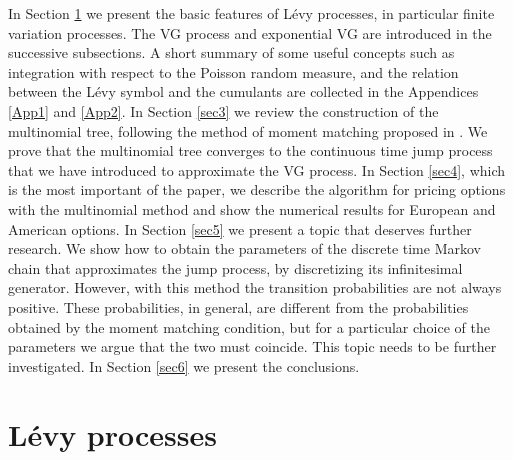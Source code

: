 \documentclass[]{interact}
\theoremstyle{plain}%
\theoremstyle{definition}
\theoremstyle{remark}
\begin{document}
In Section \ref{sec2} we present the basic features of Lévy processes, in particular finite variation processes. 
The VG process and exponential VG are introduced in the successive subsections. 
A short summary of
some useful concepts such as integration with respect to the Poisson random measure, and the relation between the Lévy symbol and the cumulants are collected in 
the Appendices \ref{App1} and \ref{App2}. 
In Section \ref{sec3} we review the construction of the multinomial tree, following the method of
moment matching proposed in \cite{YaPr01}. We prove that the multinomial tree converges to the continuous time jump process that we have
introduced to approximate the VG process.
In Section \ref{sec4}, which is the most important of the paper, we describe the algorithm for pricing options with the 
multinomial method and show the numerical results for European and American options.
In Section \ref{sec5} we present a topic that deserves further research. 
We show how to obtain the parameters of the discrete time Markov chain that approximates the jump process, by discretizing its infinitesimal generator.
However, with this method the transition probabilities are not always positive. These probabilities, in general, are different from the probabilities obtained by
the moment matching condition, but for a particular choice of the parameters we argue that the two must coincide. This topic needs to be further investigated.
In Section \ref{sec6} we present the conclusions.




\section{Lévy processes}\label{sec2}
\end{document}
